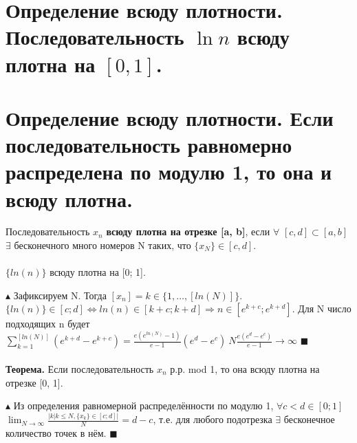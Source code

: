 \setcounter{section}{36}
\section{Определение всюду плотности. Последовательность $\ln n$ всюду плотна на \texorpdfstring{$[0, 1]$}{[0, 1]}.}

\section{Определение всюду плотности. Если последовательность равномерно распределена по модулю 1, то она и всюду плотна.}
Последовательность $x_n$ \textbf{всюду плотна на отрезке [a, b]}, если $\forall$ $[c, d] \subset [a, b]$ $\exists$ бесконечного много номеров N таких, что $\{x_N\} \in [c, d]$. \\
\\
$\{ln(n)\}$ всюду плотна на [0; 1]. \par
$\blacktriangle$
Зафиксируем N. Тогда $[x_n] = k \in \{1, \dots, [ln(N)]\}$. $\{ln(n)\} \in [c; d] \Leftrightarrow ln(n) \in [k + c; k + d] \Rightarrow n \in [e^{k+c}; e^{k+d}]$. Для N число подходящих n будет $\sum_{k=1}^{[ln(N)]} (e^{k+d} - e^{k+c}) = \frac{e(e^{ln(N)} - 1)}{e-1}(e^d - e^c) ~ N \frac{e(e^d - e^c)}{e-1} \to \infty$
$\blacksquare$ \\
\\
\textbf{Теорема.} Если последовательность $x_n$ р.р. mod 1, то она всюду плотна на отрезке [0, 1]. \par
$\blacktriangle$
Из определения равномерной распределённости по модулю 1, $\forall c < d \in [0; 1]$ \\ $\lim_{N \to \infty} \frac{|k|k\leqslant N, \{x_k\} \in [c; d]|}{N} = d - c $, т.е. для любого подотрезка $\exists$ бесконечное количество точек в нём.
$\blacksquare$ 